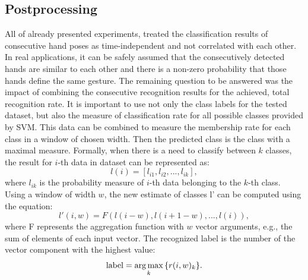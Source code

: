 \subsection{Postprocessing}


All of already presented experiments, treated the classification results of consecutive hand poses as time-independent and not correlated with each other.
In real applications, it can be safely assumed that the consecutively detected hands are similar to each other and there is a non-zero probability that those hands define the same gesture.
The remaining question to be answered was the impact of combining the consecutive recognition results for the achieved, total recognition rate.
It is important to use not only the class labels for the tested dataset, but also the measure of classification rate for all possible classes provided by SVM.
This data can be combined to measure the membership rate for each class in a window of chosen width.
Then the predicted class is the class with a maximal measure.
Formally, when there is a need to classify between $k$ classes, the result for $i$-th data in dataset can be represented as:
\begin {equation}
l(i) = [l_{i1}, l_{i2}, ..., l_{ik}],
\end{equation}
where $l_{ik}$ is the probability measure of $i$-th data belonging to the $k$-th class.
Using a window of width $w$, the new estimate of classes l' can be computed using the equation:
\begin{equation}
l'(i,w) = F( l(i-w), l(i+1-w), ..., l(i) ),
\end{equation}
where F represents the aggregation function with $w$ vector arguments, e.g., the sum of elements of each input vector.
The recognized label is the number of the vector component with the highest value:
\begin{equation}
\mathrm{label} = \operatorname*{arg\,max}_{k}{\{r(i,w)_k\}}.
\end{equation}


